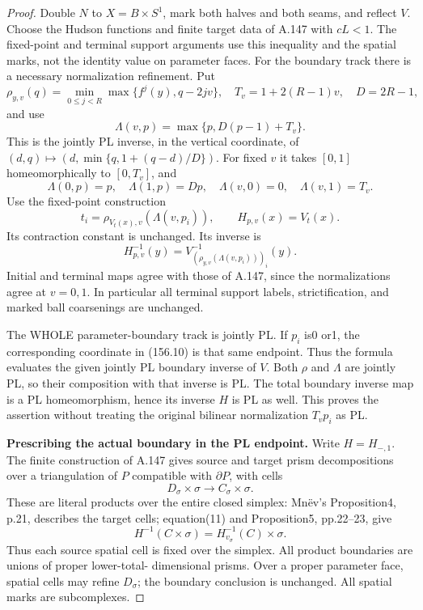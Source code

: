\begin{proof}
Double $N$ to $X=B\times S^1$, mark both halves and both
seams, and reflect $V$. Choose the Hudson functions and
finite target data of A.147 with $cL<1$. The fixed-point
and terminal support arguments use this inequality and
the spatial marks, not the identity value on parameter
faces. For the boundary track there is a necessary
normalization refinement. Put
\[
 \rho_{y,v}(q)=\min_{0\le j<R}\max\{f^j(y),q-2jv\},
 \quad T_v=1+2(R-1)v,\quad D=2R-1,
\]
and use
\[
 \Lambda(v,p)=\max\{p,D(p-1)+T_v\}.
 \tag{156.8}
\]
This is the jointly PL inverse, in the vertical coordinate,
of $(d,q)\mapsto(d,\min\{q,1+(q-d)/D\})$.
For fixed $v$ it takes $[0,1]$ homeomorphically to
$[0,T_v]$, and
\[
 \Lambda(0,p)=p,\quad\Lambda(1,p)=Dp,\quad
 \Lambda(v,0)=0,\quad\Lambda(v,1)=T_v.
\]
Use the fixed-point construction
\[
 t_i=\rho_{V_t(x),v}(\Lambda(v,p_i)),\qquad
 H_{p,v}(x)=V_t(x).
 \tag{156.9}
\]
Its contraction constant is unchanged. Its inverse is
\[
 H_{p,v}^{-1}(y)=
 V^{-1}_{(\rho_{y,v}(\Lambda(v,p_i)))_i}(y).
 \tag{156.10}
\]
Initial and terminal maps agree with those of A.147, since
the normalizations agree at $v=0,1$. In particular all
terminal support labels, strictification, and marked ball
coarsenings are unchanged.

The WHOLE parameter-boundary track is jointly PL.
If $p_i$ is0 or1, the corresponding coordinate in (156.10)
is that same endpoint. Thus the formula evaluates the
given jointly PL boundary inverse of $V$. Both $\rho$
and $\Lambda$ are jointly PL, so their composition with
that inverse is PL. The total boundary inverse map is a
PL homeomorphism, hence its inverse $H$ is PL as well.
This proves the assertion without treating the original
bilinear normalization $T_vp_i$ as PL.

\textbf{Prescribing the actual boundary in the PL endpoint.}\quad
Write $H=H_{-,1}$. The finite construction of A.147 gives
source and target prism decompositions over a triangulation
of $P$ compatible with $\partial P$, with cells
\[
 D_\sigma\times\sigma\longrightarrow C_\sigma\times\sigma.
 \tag{156.11}
\]
These are literal products over the entire closed simplex:
Mn\"ev's Proposition4, p.21, describes the target cells;
equation(11) and Proposition5, pp.22--23, give
\[
 H^{-1}(C\times\sigma)=H_{v_\sigma}^{-1}(C)\times\sigma.
\]
Thus each source spatial cell is fixed over the simplex.
All product boundaries are unions of proper lower-total-
dimensional prisms. Over a proper parameter face, spatial
cells may refine $D_\sigma$; the boundary conclusion is
unchanged. All spatial marks are subcomplexes.


\end{proof}
